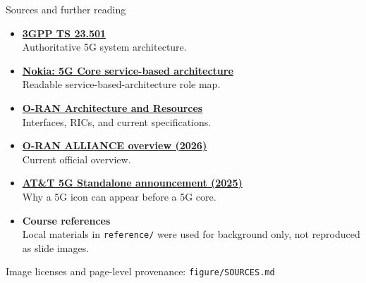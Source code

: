 \begin{frame}{Sources and further reading}
  \small
  \begin{itemize}\itemsep5pt
    \item \href{https://portal.3gpp.org/desktopmodules/Specifications/SpecificationDetails.aspx?specificationId=3144}{\textbf{3GPP TS 23.501}}\\
      {\footnotesize\color{softgray}Authoritative 5G system architecture.}
    \item \href{https://www.nokia.com/asset/i/210365/}{\textbf{Nokia: 5G Core service-based architecture}}\\
      {\footnotesize\color{softgray}Readable service-based-architecture role map.}
    \item \href{https://www.o-ran.org/o-ran-resources}{\textbf{O-RAN Architecture and Resources}}\\
      {\footnotesize\color{softgray}Interfaces, RICs, and current specifications.}
    \item \href{https://mediastorage.o-ran.org/overview/o-ran-overview-presentation/o-ran-overview-of-the-o-ran-alliance-presentation.pdf}{\textbf{O-RAN ALLIANCE overview (2026)}}\\
      {\footnotesize\color{softgray}Current official overview.}
    \item \href{https://about.att.com/blogs/2025/5g-standalone-nationwide.html}{\textbf{AT\&T 5G Standalone announcement (2025)}}\\
      {\footnotesize\color{softgray}Why a 5G icon can appear before a 5G core.}
    \item \textbf{Course references}\\
      {\footnotesize\color{softgray}Local materials in \texttt{reference/} were used for background only,
      not reproduced as slide images.}
  \end{itemize}

  \vspace{0.4em}
  \centering
  \small Image licenses and page-level provenance: \texttt{figure/SOURCES.md}
\end{frame}
